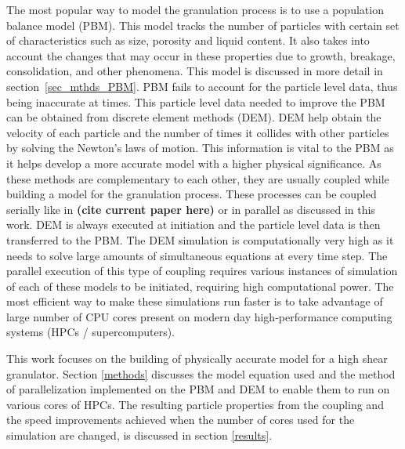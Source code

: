 \documentclass[fleqn,twoside,10pt]{article}
\begin{document}
The most popular way to model the granulation process is to use a population balance model (PBM). This model 
tracks the number of particles with certain set of characteristics such as 
size, porosity and liquid content. 
It also takes into account the changes that may occur in these properties due to growth, breakage, consolidation, 
and other phenomena. This model is discussed in more detail in 
section~\ref{sec_mthds_PBM}. PBM fails to account 
for the particle level data, thus being inaccurate at times. This particle level data needed to improve the PBM 
can be obtained from discrete element methods (DEM). DEM help obtain the velocity of each particle and the 
number of times it collides with other particles by solving the Newton's laws of motion. This information 
is vital to the PBM as it helps develop a more accurate model with a higher physical significance. As these 
methods are complementary to each other, they are usually coupled while 
building a model for the granulation 
process. These processes can be coupled serially like in \textbf{(cite current paper here)} or in parallel as 
discussed in this work. DEM is always executed at initiation and the particle level data is then transferred to 
the PBM. The DEM simulation is computationally very high as it needs to solve large amounts of simultaneous 
equations at every time step. The parallel execution of this type of coupling requires various instances 
of simulation of each of these models to be initiated, requiring high computational power. The most efficient way 
to make these simulations run faster is to take advantage of large number of CPU cores present on modern day 
high-performance computing systems (HPCs / supercomputers).

This work focuses on the building of physically accurate model for a high shear 
granulator. Section \ref{methods} 
discusses the model equation used and the method of parallelization implemented on the PBM and DEM to enable them to 
run on various cores of HPCs. The resulting particle properties from the coupling and the speed improvements 
achieved when the number of cores used for the simulation are changed, is discussed in section \ref{results}.

\end{document}
